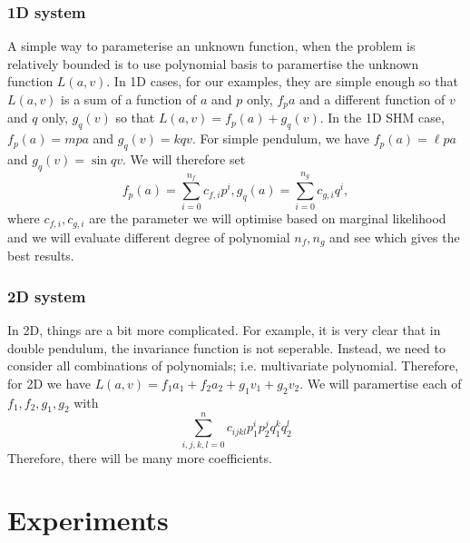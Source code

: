 \documentclass{statsmsc}
\begin{document}
\subsection{1D system}
A simple way to parameterise an unknown function, when the problem is relatively bounded is to use polynomial basis to paramertise the unknown function $L(a,v)$.
In 1D cases, for our examples, they are simple enough so that $L(a,v)$ is a sum of a function of $a$ and $p$ only, $f_pa$ and a different function of $v$ and $q$ only, $g_q(v)$ so that $L(a,v)=f_p(a)+g_q(v)$.
In the 1D SHM case, $f_p(a)=mpa$ and $g_q(v)=kqv$.
For simple pendulum, we have $f_p(a)=\ell pa$ and $g_q(v)=\sin qv$.
We will therefore set $$f_p(a)=\sum_{i=0}^{n_f}c_{f,i}p^i,g_q(a)=\sum_{i=0}^{n_g}c_{g,i}q^i,$$
where $c_{f,i}, c_{g,i}$ are the parameter we will optimise based on marginal likelihood and we will evaluate different degree of polynomial $n_f, n_g$ and see which gives the best results. 

\subsection{2D system}
In 2D, things are a bit more complicated. For example, it is very clear that in double pendulum, the invariance function is not seperable.
Instead, we need to consider all combinations of polynomials; i.e. multivariate polynomial.
Therefore, for 2D we have $L(a,v)=f_1a_1+f_2a_2+g_1v_1+g_2v_2.$
We will paramertise each of $f_1, f_2, g_1, g_2$ with $$\sum_{i,j,k,l=0}^{n}c_{ijkl}p_1^ip_2^jq_1^kq_2^l$$
Therefore, there will be many more coefficients.

\chapter{Experiments}
\end{document}
